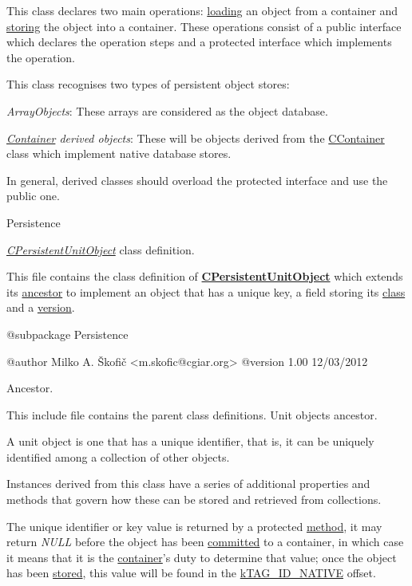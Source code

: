 This class declares two main operations\-: \hyperlink{}{loading} an object from a container and \hyperlink{}{storing} the object into a container. These operations consist of a public interface which declares the operation steps and a protected interface which implements the operation.

This class recognises two types of persistent object stores\-:


\begin{DoxyItemize}
\item {\itshape Array\-Objects\/}\-: These arrays are considered as the object database. 
\item {\itshape \hyperlink{class_c_container}{Container} derived objects\/}\-: These will be objects derived from the \hyperlink{class_c_container}{C\-Container} class which implement native database stores. 
\end{DoxyItemize}

In general, derived classes should overload the protected interface and use the public one.

Persistence

{\itshape \hyperlink{class_c_persistent_unit_object}{C\-Persistent\-Unit\-Object}\/} class definition.

This file contains the class definition of {\bfseries \hyperlink{class_c_persistent_unit_object}{C\-Persistent\-Unit\-Object}} which extends its \hyperlink{class_c_persistent_object}{ancestor} to implement an object that has a unique key, a field storing its \hyperlink{}{class} and a \hyperlink{}{version}.

\begin{DoxyVerb}    @subpackage     Persistence

    @author         Milko A. Škofič <m.skofic@cgiar.org>
    @version        1.00 12/03/2012\end{DoxyVerb}


Ancestor.

This include file contains the parent class definitions. Unit objects ancestor.

A unit object is one that has a unique identifier, that is, it can be uniquely identified among a collection of other objects.

Instances derived from this class have a series of additional properties and methods that govern how these can be stored and retrieved from collections.

The unique identifier or key value is returned by a protected \hyperlink{}{method}, it may return {\itshape N\-U\-L\-L\/} before the object has been \hyperlink{}{committed} to a container, in which case it means that it is the \hyperlink{class_c_container}{container}'s duty to determine that value; once the object has been \hyperlink{}{stored}, this value will be found in the \hyperlink{}{k\-T\-A\-G\-\_\-\-I\-D\-\_\-\-N\-A\-T\-I\-V\-E} offset.

